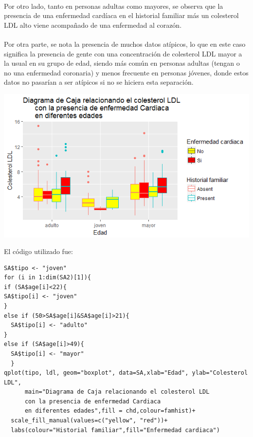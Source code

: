 \documentclass[11pt,a4paper]{article}
\begin{document}
\begin{itemize}
\\
Por otro lado, tanto en personas adultas como mayores, se observa que la presencia de una enfermedad cardíaca en el historial familiar más un colesterol LDL alto viene acompañado de una enfermedad al corazón.\\
\\
Por otra parte, se nota la presencia de muchos datos atípicos, lo que en este caso significa la presencia de gente con una concentración de colesterol LDL mayor a la usual en su grupo de edad, siendo más común en personas adultas (tengan o no una enfermedad coronaria) y menos frecuente en personas jóvenes, donde estos datos no pasarían a ser atípicos si no se hiciera esta separación.
\begin{center}
\includegraphics[scale=0.7]{boxplot}
\end{center}
El código utilizado fue:
\begin{verbatim}
SA$tipo <- "joven"
for (i in 1:dim(SA2)[1]){
if (SA$age[i]<22){
SA$tipo[i] <- "joven"
} 
else if (50>SA$age[i]&SA$age[i]>21){
  SA$tipo[i] <- "adulto"
} 
else if (SA$age[i]>49){
  SA$tipo[i] <- "mayor"
  }
qplot(tipo, ldl, geom="boxplot", data=SA,xlab="Edad", ylab="Colesterol LDL",
      main="Diagrama de Caja relacionando el colesterol LDL
      con la presencia de enfermedad Cardiaca
      en diferentes edades",fill = chd,colour=famhist)+
  scale_fill_manual(values=c("yellow", "red"))+
  labs(colour="Historial familiar",fill="Enfermedad cardiaca")
\end{verbatim}


\end{itemize}
\end{document}
